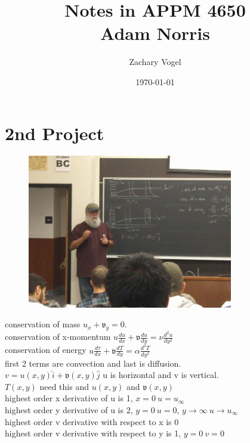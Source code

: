 \documentclass{article}
\begin{document}
\author{Zachary Vogel}
\date{\today}
\title{Notes in APPM 4650\\Adam Norris}

\maketitle



\section{2nd Project}
\begin{figure}[h!]
    \centering
    \includegraphics[width=0.8\textwidth]{proj21.jpg}
\end{figure}
conservation of mass $u_x+\mathfrak{v}_y=0$.\\
conservation of x-momentum $u\frac{du}{dx}+\mathfrak{v}\frac{du}{dy}=\nu\frac{d^2u}{dy^2}$\\
conservation of energy $u\frac{d\tau}{dx}+\mathfrak{v}\frac{dT}{dy}=\alpha\frac{d^2T}{dy^2}$\\
first 2 terms are convection and last is diffusion.\\
$v=u(x,y)\hat{i}+\mathfrak{v}(x,y)\hat{j}$ u is horizontal and v is vertical.\\
$T(x,y)$ need this and $u(x,y)$ and $\mathfrak{v}(x,y)$\\

highest order x derivative of u is 1, $x=0\ u=u_\infty$\\
highest order y derivative of u is 2, $y=0\ u=0$, $y\to\infty\ u\to u_\infty$\\

highest order v derivative with respect to x is 0\\
highest order v derivative with respect to y is 1, $y=0\ v=0$\\
\end{document}
